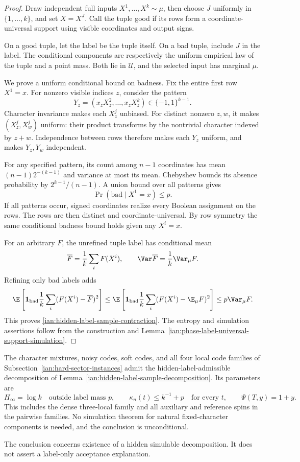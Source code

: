\begin{proof}
Draw independent full inputs
\(X^1,\ldots,X^k\sim\mu\), then choose \(J\) uniformly in
\(\{1,\ldots,k\}\), and set \(X=X^J\). Call the tuple good if its rows form a coordinate-universal support using visible coordinates and output signs.

On a good tuple, let the label be the tuple itself. On a bad tuple, include \(J\) in the label. The conditional components are respectively the uniform empirical law of the tuple and a point mass. Both lie in \(\mathcal U\), and the selected input has marginal \(\mu\).

We prove a uniform conditional bound on badness. Fix the entire first row \(X^1=x\). For nonzero visible indices \(z\), consider the pattern
\[
 Y_z=(x_zX_z^2,\ldots,x_zX_z^k)\in\{-1,1\}^{k-1}.
\]
Character invariance makes each \(X_z^j\) unbiased. For distinct nonzero \(z,w\), it makes \((X_z^j,X_w^j)\) uniform: their product transforms by the nontrivial character indexed by \(z+w\). Independence between rows therefore makes each \(Y_z\) uniform, and makes \(Y_z,Y_w\) independent.

For any specified pattern, its count among \(n-1\) coordinates has mean
\((n-1)2^{-(k-1)}\) and variance at most its mean. Chebyshev bounds its absence probability by \(2^{k-1}/(n-1)\). A union bound over all patterns gives
\[
 \Pr(\text{bad}\mid X^1=x)\le p.
\]
If all patterns occur, signed coordinates realize every Boolean assignment on the rows. The rows are then distinct and coordinate-universal. By row symmetry the same conditional badness bound holds given any \(X^i=x\).

For an arbitrary \(F\), the unrefined tuple label has conditional mean
\[
 \overline F=\frac1k\sum_iF(X^i),
 \qquad \Var\overline F=\frac1k\Var_\mu F.
\]
Refining only bad labels adds
\[
 \E\left[
 \mathbf1_{\rm bad}\frac1k\sum_i
       (F(X^i)-\overline F)^2\right]
 \le
 \E\left[
 \mathbf1_{\rm bad}\frac1k\sum_i
       (F(X^i)-\E_\mu F)^2\right]
 \le p\Var_\mu F.
\]
This proves \eqref{ian:hidden-label-sample-contraction}. The entropy and simulation assertions follow from the construction and
Lemma~\ref{ian:phase-label-universal-support-simulation}.
\end{proof}

\begin{corollary}
\label{ian:hidden-label-obstruction-families}
The character mixtures, noisy codes, soft codes, and all four local code families of
Subsection~\ref{ian:hard-sector-instances}
admit the hidden-label-admissible decomposition of
Lemma~\ref{ian:hidden-label-sample-decomposition}. Its parameters are
\[
 H_\infty=\log k\quad\text{outside label mass }p,\qquad
 \kappa_n(t)\le k^{-1}+p\quad\text{for every }t,
 \qquad \Psi(T,y)=1+y.
\]
This includes the dense three-local family and all auxiliary and reference spins in the pairwise families. No simulation theorem for natural fixed-character components is needed, and the conclusion is unconditional.

The conclusion concerns existence of a hidden simulable decomposition. It does not assert a label-only acceptance explanation.
\end{corollary}

